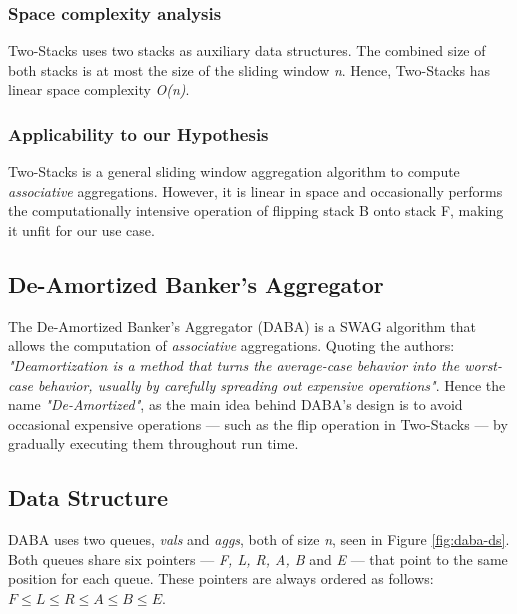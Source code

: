 \subsubsection*{Space complexity analysis}
Two-Stacks uses two stacks as auxiliary data structures. The combined size of both stacks is at most the size of the sliding window \textit{n}. Hence, Two-Stacks has linear space complexity \textit{O(n)}.

\subsubsection*{Applicability to our Hypothesis}
Two-Stacks is a general sliding window aggregation algorithm to compute \textit{associative} aggregations. However, it is linear in space and occasionally performs the computationally intensive operation of flipping stack B onto stack F, making it unfit for our use case.


\subsection{De-Amortized Banker’s Aggregator} \label{sec:daba}

The De-Amortized Banker’s Aggregator (DABA) \cite{Tangwongsan-DABA} is a SWAG algorithm that allows the computation of \textit{associative} aggregations. Quoting the authors: \textit{"Deamortization is a method that turns the average-case behavior into the worst-case behavior, usually by carefully spreading out expensive operations"}. Hence the name \textit{"De-Amortized"}, as the main idea behind DABA's design is to avoid occasional expensive operations --- such as the flip operation in Two-Stacks --- by gradually executing them throughout run time.

\subsection*{Data Structure}

DABA uses two queues, \textit{vals} and \textit{aggs}, both of size \textit{n}, seen in Figure \ref{fig:daba-ds}. Both queues share six pointers --- \textit{F, L, R, A, B} and \textit{E} --- that point to the same position for each queue. These pointers are always ordered as follows: $\textit{F} \leq \textit{L} \leq \textit{R} \leq \textit{A} \leq \textit{B} \leq \textit{E}.$

